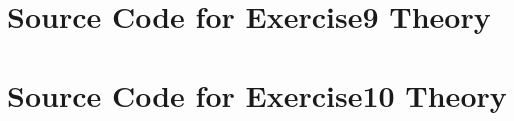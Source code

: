 \documentclass[11pt, twoside]{article}
\begin{document}
\HOLexerciseOneZeroTheorems

\HOLindex

\newpage 

\appendix

\section{Source Code for Exercise9 Theory}
\label{sec:source-code-exerc}



\newpage

\section{Source Code for Exercise10 Theory}
\label{sec:source-code-exerc-1}


\end{document}
